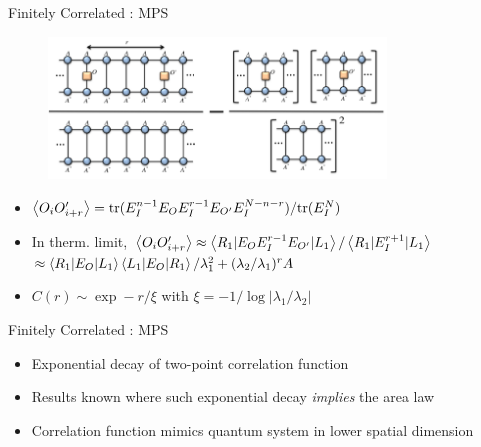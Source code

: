 \documentclass{beamer}
\begin{document}
\begin{frame}{Finitely Correlated : MPS}
	\begin{figure}[h]
	\includegraphics[width=0.8\textwidth]{corr}
	\centering
	\end{figure}
\begin{itemize}
\item ${ \ev{O_{i}O^{\prime}_{i+r}}=\text{tr}(E_{I}^{n-1}E_{O}E_{I}^{r-1}E_{O^{\prime}}E_{I}^{N-n-r}) /\text{tr}(E_{I}^{N})}$\\
\item	In therm. limit, ${ \ev{O_{i}O^{\prime}_{i+r}}\approx \ev{R_{1}|E_{O}E_{I}^{r-1}E_{O^{\prime}}|L_{1}}/\ev{R_{1}|E_{I}^{r+1}|L_{1}}}$\\
	${ \approx \ev{R_{1}|E_{O}|L_{1}}\ev{L_{1}|E_{O}|R_{1}}/\lambda _{1}^{2} }+(\lambda _{2}/\lambda _{1})^{r}A$
	\item ${ C(r)\sim \exp -r/\xi }$ with ${ \xi =-1  /\log{|\lambda _{1}/\lambda _{2}|}}$

\end{itemize}
\end{frame}

\begin{frame}{Finitely Correlated : MPS}
	\begin{itemize}
	\item Exponential decay of two-point correlation function
	\item Results known where such exponential decay \textit{implies} the area law
	\item Correlation function mimics quantum system in lower spatial dimension
	\end{itemize}
\end{frame}
\end{document}
